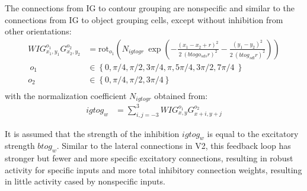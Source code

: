 The connections from IG to contour grouping are nonspecific and similar to the connections from IG to object grouping cells, except without inhibition from other orientations:
\begin{align}
  WIG^{o_1}_{x_1,y_1}G^{o_2}_{x_2,y_2}&=\text{rot}_{o_1}\left(N_{igtogr}\:
          \exp\left(-\frac{(x_1-x_2+r)^2}{2\: (btogo_{sds} r)^2}
                  -\frac{(y_1-y_2)^2}{2\: (btog_{sdl} r)^2}\right)\right) \nonumber\\ \ 
	 o_1&\in \left\{0,\pi/4,\pi/2,3\pi/4,\pi,5\pi/4,3\pi/2,7\pi/4\ \right\} \nonumber\\
	 o_2&\in \left\{0,\pi/4,\pi/2,3\pi/4 \right\} \nonumber\\
\end{align}
with the normalization coefficient $N_{igtogr}$ obtained from:
\begin{align}
	igtog_w&=\sum^{3}_{i,j=-3} WIG^{o_1}_{x,y}G^{o_2}_{x+i,y+j} 	
\end{align}

It is assumed that the strength of the inhibition $igtog_w$ is equal to the excitatory strength $btog_w$. Similar to the lateral connections in V2, this feedback loop has stronger but fewer and more specific excitatory connections, resulting in robust activity for specific inputs and more total inhibitory connection weights, resulting in
little activity cased by nonspecific inputs.

\clearpage

